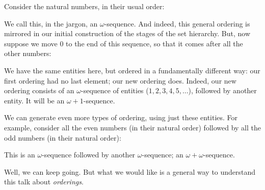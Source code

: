 \documentclass[10pt,a4paper]{article}
\theoremstyle{plain}
\theoremstyle{definition}
\theoremstyle{remark}
\begin{document}
Consider the natural numbers, in their usual order:
\begin{center}
\end{center}
We call this, in the jargon, an $\omega$-sequence. And indeed, this
general ordering is mirrored in our initial construction of the stages
of the set hierarchy. But, now suppose we move $0$ to the end of this
sequence, so that it comes after all the other numbers:
\begin{center}
\end{center}
We have the same entities here, but ordered in a fundamentally
different way: our first ordering had no last element; our new
ordering does. Indeed, our new ordering consists of an
$\omega$-sequence of entities ($1, 2, 3, 4, 5, \ldots$), followed by
another entity. It will be an $\omega+1$-sequence.

We can generate even more types of ordering, using just these
entities. For example, consider all the even numbers (in their natural
order) followed by all the odd numbers (in their natural order):
\begin{center}
\end{center}
This is an $\omega$-sequence followed by another $\omega$-sequence; an
$\omega+\omega$-sequence. 

Well, we can keep going. But what we would like is a general way to
understand this talk about \emph{orderings}. 
\end{document}

